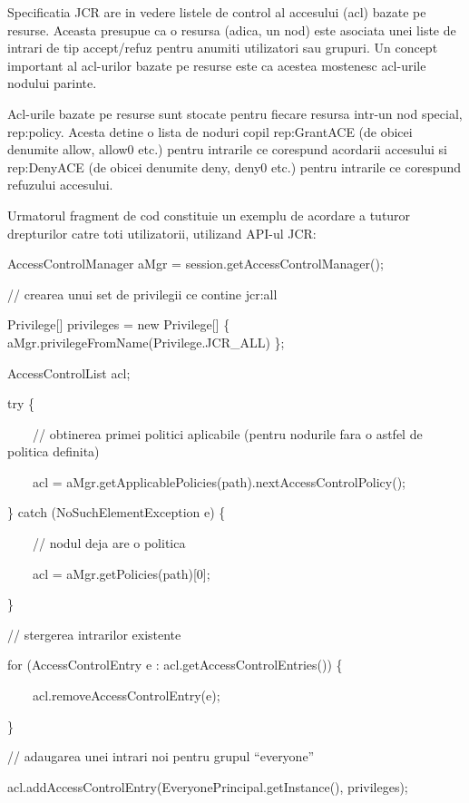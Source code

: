 \bigskip

Specificatia JCR are in vedere listele de control al accesului (acl) bazate pe resurse. Aceasta presupue ca o resursa (adica, un nod) este asociata unei liste de intrari de tip accept/refuz pentru anumiti utilizatori sau grupuri. Un concept important al acl-urilor bazate pe resurse este ca acestea mostenesc acl-urile nodului parinte.

Acl-urile bazate pe resurse sunt stocate pentru fiecare resursa intr-un nod special, rep:policy. Acesta detine o lista de noduri copil rep:GrantACE (de obicei denumite allow, allow0 etc.) pentru intrarile ce corespund acordarii accesului si rep:DenyACE (de obicei denumite deny, deny0 etc.) pentru intrarile ce corespund refuzului accesului. 


\bigskip

Urmatorul fragment de cod constituie un exemplu de acordare a tuturor drepturilor catre toti utilizatorii, utilizand API-ul JCR:


\bigskip

AccessControlManager aMgr = session.getAccessControlManager();


\bigskip

// crearea unui set de privilegii ce contine jcr:all

Privilege[] privileges = new Privilege[] \{ aMgr.privilegeFromName(Privilege.JCR\_ALL) \};

AccessControlList acl;

try \{

\ \ \ \ // obtinerea primei politici aplicabile (pentru nodurile fara o astfel de politica definita)

\ \ \ \ acl = aMgr.getApplicablePolicies(path).nextAccessControlPolicy();

\} catch (NoSuchElementException e) \{

\ \ \ \ // nodul deja are o politica

\ \ \ \ acl = aMgr.getPolicies(path)[0];

\}

// stergerea intrarilor existente

for (AccessControlEntry e : acl.getAccessControlEntries()) \{

\ \ \ \ acl.removeAccessControlEntry(e);

\}

// adaugarea unei intrari noi pentru grupul ``everyone''

acl.addAccessControlEntry(EveryonePrincipal.getInstance(), privileges);


